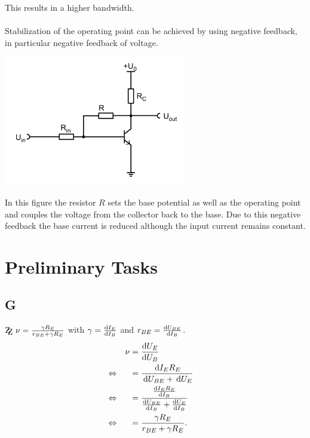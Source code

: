 \documentclass[a4paper,10pt]{article}
\newcommand{\td}{\,\text{d}}
\newcommand{\zz}{\mathrm{Z\kern-.3em\raise-0.5ex\hbox{Z} }}
\newenvironment{Figure}
  {\par\medskip\noindent\minipage{\linewidth}}
  {\endminipage\par\medskip} %
\numberwithin{equation}{section}
\begin{document}
\begin{multicols}{2}
        This results in a higher bandwidth.
        \\\\ Stabilization of the operating point can be achieved by using negative feedback, in particular negative feedback of voltage.
        \begin{Figure}
                \centering
                \includegraphics[width=0.6\textwidth]{spannungsgegenkopplung.png}
        \end{Figure}
        In this figure the resistor $R$ sets the base potential as well as the operating point and couples the voltage from the collector back to the base.
        Due to this negative feedback the base current is reduced although the input current remains constant.

	\newpage
	\section{Preliminary Tasks}
	\subsection{G}
	$\zz\ \nu =\tfrac{\gamma R_E}{r_{BE}+\gamma R_E}$ with $\gamma =\diff[]{I_E}{I_B}$ and $r_{BE}=\diff[]{U_{BE}}{I_B}$.
	\begin{align}
		                &  & \nu  & = \diff[]{U_E}{U_B}                                                    &  &           \\
		\Leftrightarrow &  &   & = \dfrac{\td I_ER_E}{\td U_{BE}+\td U_E}                               &  & \nonumber \\
		\Leftrightarrow &  &   & = \dfrac{\diff[]{I_ER_E}{I_B}}{\diff[]{U_{BE}}{I_B}+\diff[]{U_E}{I_B}} &  & \nonumber \\
		\Leftrightarrow &  &   & = \dfrac{\gamma R_E}{r_{BE}+\gamma R_E}.                               &  &
	\end{align}


\end{multicols}
\end{document}

